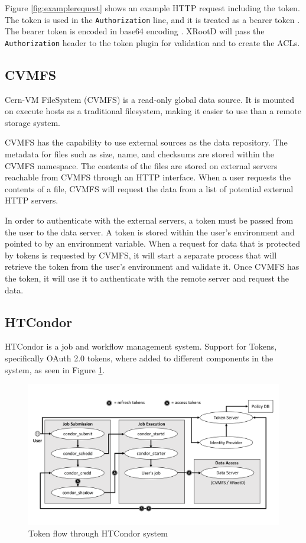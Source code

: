 \documentclass{webofc}
\begin{document}
Figure \ref{fig:examplerequest} shows an example HTTP request including the token.  The token is used in the \texttt{Authorization} line, and it is treated as a bearer token \cite{jones2012oauth}.  The bearer token is encoded in base64 encoding \cite{josefsson2006base16}.  XRootD will pass the \texttt{Authorization} header to the token plugin for validation and to create the ACLs.

\subsection{CVMFS}
\label{sec:cvmfs}

Cern-VM FileSystem (CVMFS) is a read-only global data source.  It is mounted on execute hosts as a traditional filesystem, making it easier to use than a remote storage system.

CVMFS has the capability to use external sources as the data repository.  The metadata for files such as size, name, and checksums are stored within the CVMFS namespace.  The contents of the files are stored on external servers reachable from CVMFS through an HTTP interface.  When a user requests the contents of a file, CVMFS will request the data from a list of potential external HTTP servers.

In order to authenticate with the external servers, a token must be passed from the user to the data server.  A token is stored within the user's environment and pointed to by an environment variable.  When a request for data that is protected by tokens is requested by CVMFS, it will start a separate process that will retrieve the token from the user's environment and validate it.  Once CVMFS has the token, it will use it to authenticate with the remote server and request the data. 

\subsection{HTCondor}
\label{sec:htcondor}

HTCondor is a job and workflow management system.  Support for Tokens, specifically OAuth 2.0 \cite{hardt2012oauth} tokens, where added to different components in the system, as seen in Figure \ref{fig:htcondorflow}.

\begin{figure}[ht]
\includegraphics[width=\textwidth]{images/HTCondorTokenFlow.pdf}
\caption{Token flow through HTCondor system}
\label{fig:htcondorflow}
\end{figure}
\end{document}
